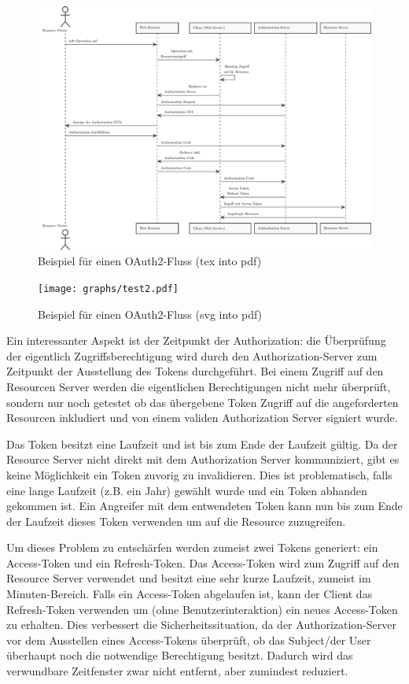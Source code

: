 \begin{figure}[h!]
	\includegraphics[width=\textwidth]{graphs/oauth2.pdf}
	\centering
	\caption{Beispiel für einen OAuth2-Fluss (tex into pdf)}
\end{figure}

\begin{figure}[h!]
	\texttt{[image: graphs/test2.pdf]}
	\centering
	\caption{Beispiel für einen OAuth2-Fluss (svg into pdf)}
\end{figure}

Ein interessanter Aspekt ist der Zeitpunkt der Authorization: die Überprüfung der eigentlich Zugriffsberechtigung wird durch den Authorization-Server zum Zeitpunkt der Ausstellung des Tokens durchgeführt. Bei einem Zugriff auf den Resourcen Server werden die eigentlichen Berechtigungen nicht mehr überprüft, sondern nur noch getestet ob das übergebene Token Zugriff auf die angeforderten Resourcen inkludiert und von einem validen Authorization Server signiert wurde.

Das Token besitzt eine Laufzeit und ist bis zum Ende der Laufzeit gültig. Da der Resource Server nicht direkt mit dem Authorization Server kommuniziert, gibt es keine Möglichkeit ein Token zuvorig zu invalidieren. Dies ist problematisch, falls eine lange Laufzeit (z.B. ein Jahr) gewählt wurde und ein Token abhanden gekommen ist. Ein Angreifer mit dem entwendeten Token kann nun bis zum Ende der Laufzeit dieses Token verwenden um auf die Resource zuzugreifen.

Um dieses Problem zu entschärfen werden zumeist zwei Tokens generiert: ein Access-Token und ein Refresh-Token. Das Access-Token wird zum Zugriff auf den Resource Server verwendet und besitzt eine sehr kurze Laufzeit, zumeist im Minuten-Bereich. Falls ein Access-Token abgelaufen ist, kann der Client das Refresh-Token verwenden um (ohne Benutzerinteraktion) ein neues Access-Token zu erhalten. Dies verbessert die Sicherheitssituation, da der Authorization-Server vor dem Ausstellen eines Access-Tokens überprüft, ob das Subject/der User überhaupt noch die notwendige Berechtigung besitzt. Dadurch wird das verwundbare Zeitfenster zwar nicht entfernt, aber zumindest reduziert.

